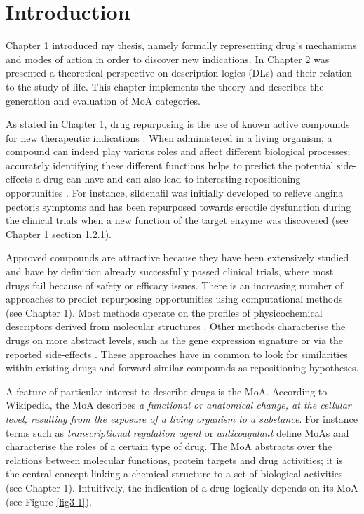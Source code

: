 \hrulefill

\section{Introduction}
Chapter 1 introduced my thesis, namely formally representing drug's mechanisms and modes of action in order to discover new indications. In Chapter 2 was presented a theoretical perspective on description logics (DLs) and their relation to the study of life. This chapter implements the theory and describes the generation and evaluation of MoA categories.

As stated in Chapter 1, drug repurposing is the use of known active compounds for new therapeutic indications \citep{sanseau2011editorial}. When administered in a living organism, a compound can indeed play various roles and affect different biological processes; accurately identifying these different functions helps to predict the potential side-effects a drug can have and can also lead to interesting repositioning opportunities \citep{medina2013shifting}. For instance, sildenafil was initially developed to relieve angina pectoris symptoms and has been repurposed towards erectile dysfunction during the clinical trials when a new function of the target enzyme was discovered (see Chapter 1 section 1.2.1). 

Approved compounds are attractive because they have been extensively studied and have by definition already successfully passed clinical trials, where most drugs fail because of safety or efficacy issues. There is an increasing number of approaches to predict repurposing opportunities using computational methods (see Chapter 1). Most methods operate on the profiles of physicochemical descriptors derived from molecular structures \citep{haupt2011old}. Other methods characterise the drugs on more abstract levels, such as the gene expression signature \citep{iorio2010discovery} or via the reported side-effects \citep{campillos2008drug}. These approaches have in common to look for similarities within existing drugs and forward similar compounds as repositioning hypotheses.

A feature of particular interest to describe drugs is the MoA. According to Wikipedia, the MoA describes \emph{a functional or anatomical change, at the cellular level, resulting from the exposure of a living organism to a substance}. For instance terms such as \emph{transcriptional regulation agent} or \emph{anticoagulant} define MoAs and characterise the roles of a certain type of drug. The MoA abstracts over the relations between molecular functions, protein targets and drug activities; it is the central concept linking a chemical structure to a set of biological activities (see Chapter 1). Intuitively, the indication of a drug logically depends on its MoA (see Figure \ref{fig3-1}).

